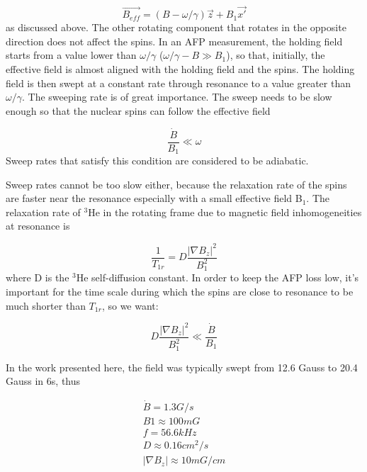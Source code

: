 \begin{equation}
\vec{B_{eff}}=(B-\omega/\gamma)\vec{z} + B_{1}\vec{x'}
\end{equation}
as discussed above. The other rotating component that rotates in the opposite direction does not affect the spins. In an AFP measurement, the holding field starts from a value lower than $\omega/\gamma$ ($\omega/\gamma-B\gg B_{1}$), so that, initially, the effective field is almost aligned with the holding field and the spins. The holding field is then swept at a constant rate through resonance to a value greater than $\omega/\gamma$. The sweeping rate is of great importance. The sweep needs to be slow enough so that the nuclear spins can follow the effective field

\begin{equation}
\frac{\dot B}{B_{1}}\ll \omega
\end{equation}
Sweep rates that satisfy this condition are considered to be adiabatic.

Sweep rates cannot be too slow either, because the relaxation rate of the spins are faster near the resonance especially with a small effective field B$_{1}$. The relaxation rate of $^{3}$He in the rotating frame due to magnetic field inhomogeneities at resonance is~\cite{PhysRevA.38.5092} 

\begin{equation}
\frac{1}{T_{1r}}=D\frac{|\nabla B_{z}|^{2}}{B_{1}^{2}} 
\end{equation}
where D is the $^{3}$He self-diffusion constant. In order to keep the AFP loss low, it's important for the time scale during which the spins are close to resonance to be much shorter than $T_{1r}$, so we want:

\begin{equation}
D\frac{|\nabla B_{z}|^{2}}{B_{1}^{2}} \ll \frac{\dot B}{B_{1}}
\end{equation}

In the work presented here, the field was typically swept from 12.6 Gauss to 20.4 Gauss in 6s, thus

\begin{subequations}
	\begin{gather}
	\dot B = 1.3G/s\\
	B1 \approx 100mG\\
	f = 56.6kHz\\
	D \approx 0.16cm^2/s\\
	|\nabla B_{z}| \approx 10mG/cm\\
	\end{gather}
\end{subequations}

